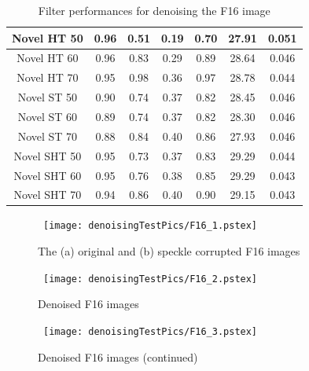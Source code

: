 \documentclass[12pt]{report}
\renewcommand{\baselinestretch}{1.5}
\begin{document}
\begin{table}[p]
\begin{center}
\begin{scriptsize}
\begin{tabular}{|c|c|c|c|c|c|c|}

Novel HT 50		& 0.96	& 0.51		& 0.19		& 0.70	& 27.91		& 0.051		\\ \hline
Novel HT 60		& 0.96	& 0.83		& 0.29		& 0.89	& 28.64		& 0.046		\\ \hline
Novel HT 70 		& 0.95	& 0.98		& 0.36		& 0.97	& 28.78		& 0.044		\\ \hline \hline

Novel ST 50		& 0.90	& 0.74 		& 0.37		& 0.82	& 28.45		& 0.046		\\ \hline
Novel ST 60		& 0.89	& 0.74		& 0.37		& 0.82	& 28.30		& 0.046		\\ \hline
Novel ST 70		& 0.88 	& 0.84		& 0.40		& 0.86	& 27.93		& 0.046		\\ \hline \hline

Novel SHT 50		& 0.95	& 0.73		& 0.37		& 0.83	& 29.29		& 0.044		\\ \hline
Novel SHT 60 		& 0.95	& 0.76		& 0.38		& 0.85	& 29.29		& 0.043		\\ \hline
Novel SHT 70		& 0.94	& 0.86		& 0.40		& 0.90	& 29.15		& 0.043		\\ \hline

\end{tabular}
\end{scriptsize}
\end{center}
\caption{Filter performances for denoising the F16 image}
\label{tab:F16DN}
\renewcommand{\baselinestretch}{1.5}
\setlength{\abovecaptionskip}{0cm}
\end{table}

\begin{figure}[p]
	\centerline{ \hbox{
                \texttt{[image: denoisingTestPics/F16\_1.pstex]}
	}}
        \caption{The (a) original and (b) speckle corrupted F16 images}
	\label{fig:F16a}
\end{figure}

\begin{figure}[p]
	\centerline{ \hbox{
                \texttt{[image: denoisingTestPics/F16\_2.pstex]}
	}}
        \caption{Denoised F16 images} 
	\label{fig:F16b}
\end{figure}
\begin{figure}[p]
	\centerline{ \hbox{
                \texttt{[image: denoisingTestPics/F16\_3.pstex]}
	}}
        \caption{Denoised F16 images (continued)} 
	\label{fig:F16c}
\end{figure}
\end{document}
